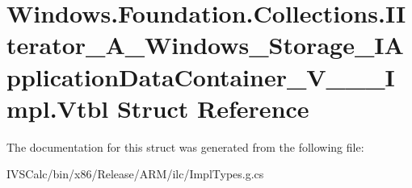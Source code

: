 \hypertarget{struct_windows_1_1_foundation_1_1_collections_1_1_i_iterator___a___windows___storage___i_applica8c7c53e1a255dfc0d2396aeacf3b1fb9}{}\section{Windows.\+Foundation.\+Collections.\+I\+Iterator\+\_\+\+A\+\_\+\+Windows\+\_\+\+Storage\+\_\+\+I\+Application\+Data\+Container\+\_\+\+V\+\_\+\+\_\+\+\_\+\+Impl.\+Vtbl Struct Reference}
\label{struct_windows_1_1_foundation_1_1_collections_1_1_i_iterator___a___windows___storage___i_applica8c7c53e1a255dfc0d2396aeacf3b1fb9}


The documentation for this struct was generated from the following file\+:\begin{DoxyCompactItemize}
\item 
I\+V\+S\+Calc/bin/x86/\+Release/\+A\+R\+M/ilc/Impl\+Types.\+g.\+cs\end{DoxyCompactItemize}
